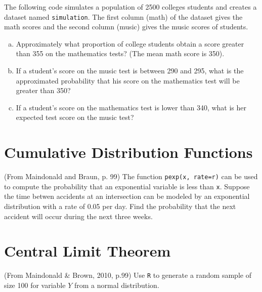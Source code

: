 \documentclass[12pt,letterpaper]{article}
\begin{document}
\noindent  The following code simulates a population of 2500 colleges students and creates a dataset named \texttt{simulation}. The first column (math) of the dataset gives the math scores and the second column (music) gives the music scores of students.

\vspace{.5cm}
  
\vspace{.5cm}

\begin{enumerate}[(a)]
	\item Approximately what proportion of college students obtain a score greater than 355 on the mathematics tests? (The mean math score is 350).
	
	
	\item If a student's score on the music test is between 290 and 295, what is the approximated probability that his score on the mathematics test will be greater than 350?

	
	\item If a student's score on the mathematics test is lower than 340, what is her expected test score on the music test? 
	

\end{enumerate}

\section{Cumulative Distribution Functions}

(From Maindonald and Braun, p. 99) The function \texttt{pexp(x, rate=r)} can be used to compute the probability that an exponential variable is less than \texttt{x}. Suppose the time betwen accidents at an intersection can be modeled by an exponential distribution with a rate of 0.05 per day. Find the probability that the next accident will occur during the next three weeks.

\section{Central Limit Theorem}

(From Maindonald \& Brown, 2010, p.99) Use \texttt{R} to generate a random sample of size 100 for variable $Y$ from a normal distribution.
\end{document}

